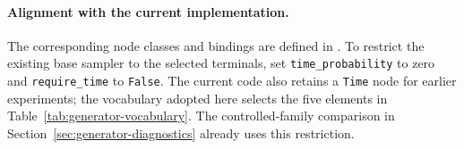 \paragraph{Alignment with the current implementation.}
The corresponding node classes and bindings are defined in
. To restrict the existing
base sampler to the selected terminals, set \texttt{time\_probability} to
zero and \texttt{require\_time} to \texttt{False}.
The current code also retains a \texttt{Time} node for earlier experiments;
the vocabulary adopted here selects the five elements in
Table~\ref{tab:generator-vocabulary}. The controlled-family comparison in
Section~\ref{sec:generator-diagnostics} already uses this restriction.

